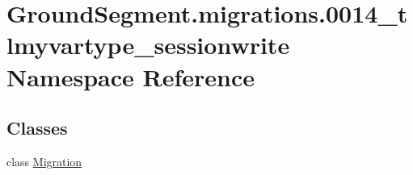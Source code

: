 \hypertarget{namespace_ground_segment_1_1migrations_1_10014__tlmyvartype__sessionwrite}{}\section{Ground\+Segment.\+migrations.0014\+\_\+tlmyvartype\+\_\+sessionwrite Namespace Reference}
\label{namespace_ground_segment_1_1migrations_1_10014__tlmyvartype__sessionwrite}
\subsection*{Classes}
\begin{DoxyCompactItemize}
\item 
class \hyperlink{class_ground_segment_1_1migrations_1_10014__tlmyvartype__sessionwrite_1_1_migration}{Migration}
\end{DoxyCompactItemize}
